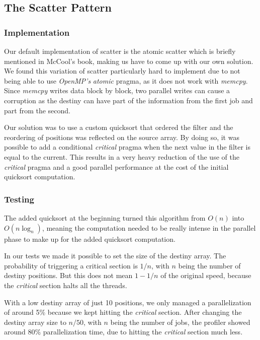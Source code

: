 \documentclass[10pt,journal]{IEEEtran}
\begin{document}
\subsection{The Scatter Pattern}
\label{scatter}

\subsubsection{Implementation}

Our default implementation of scatter is the atomic scatter which is briefly mentioned in McCool's book, making us have to come up with our own solution. We found this variation of scatter particularly hard to implement due to not being able to use \textit{OpenMP's} \textit{atomic} pragma, as it does not work with \textit{memcpy}. Since \textit{memcpy} writes data block by block, two parallel writes can cause a corruption as the destiny can have part of the information from the first job and part from the second.

Our solution was to use a custom quicksort that ordered the filter and the reordering of positions was reflected on the source array. By doing so, it was possible to add a conditional \textit{critical} pragma when the next value in the filter is equal to the current. This results in a very heavy reduction of the use of the \textit{critical} pragma and a good parallel performance at the cost of the initial quicksort computation.

\subsubsection{Testing}

The added quicksort at the beginning turned this algorithm from $ O(n) $ into $ O(n\log_n) $, meaning the computation needed to be really intense in the parallel phase to make up for the added quicksort computation. 

In our tests we made it possible to set the size of the destiny array. The probability of triggering a critical section is $ 1 / n $, with $ n $ being the number of destiny positions. But this does not mean $ 1 - 1 / n $ of the original speed, because the \textit{critical} section halts all the threads. 

With a low destiny array of just 10 positions, we only managed a parallelization of around 5\% because we kept hitting the \textit{critical} section. After changing the destiny array size to $ n / 50 $, with $ n $ being the number of jobs, the profiler showed around 80\% parallelization time, due to hitting the \textit{critical} section much less.
\end{document}
